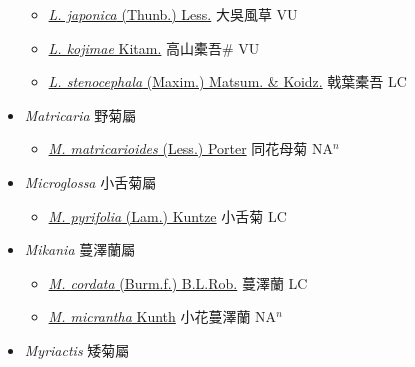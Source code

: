 \begin{itemize}
  \begin{itemize}
        \item[] \href{http://www.theplantlist.org/tpl1.1/search?q=Ligularia+japonica}{\textit{L. japonica} (Thunb.) Less.}   大吳風草 VU
        \item[] \href{http://www.theplantlist.org/tpl1.1/search?q=Ligularia+kojimae}{\textit{L. kojimae} Kitam.}   高山橐吾\# VU
        \item[] \href{http://www.theplantlist.org/tpl1.1/search?q=Ligularia+stenocephala}{\textit{L. stenocephala} (Maxim.) Matsum. \& Koidz.}   戟葉橐吾 LC
  \end{itemize}
 \item[] \textit{Matricaria} 野菊屬
                    
  \begin{itemize}
        \item[] \href{http://www.theplantlist.org/tpl1.1/search?q=Matricaria+matricarioides}{\textit{M. matricarioides} (Less.) Porter}   同花母菊 NA$^n$
  \end{itemize}
 \item[] \textit{Microglossa} 小舌菊屬
                    
  \begin{itemize}
        \item[] \href{http://www.theplantlist.org/tpl1.1/search?q=Microglossa+pyrifolia}{\textit{M. pyrifolia} (Lam.) Kuntze}   小舌菊 LC
  \end{itemize}
 \item[] \textit{Mikania} 蔓澤蘭屬
                    
  \begin{itemize}
        \item[] \href{http://www.theplantlist.org/tpl1.1/search?q=Mikania+cordata}{\textit{M. cordata} (Burm.f.) B.L.Rob.}   蔓澤蘭 LC
        \item[] \href{http://www.theplantlist.org/tpl1.1/search?q=Mikania+micrantha}{\textit{M. micrantha} Kunth}   小花蔓澤蘭 NA$^n$
  \end{itemize}
 \item[] \textit{Myriactis} 矮菊屬
                    

\end{itemize}
